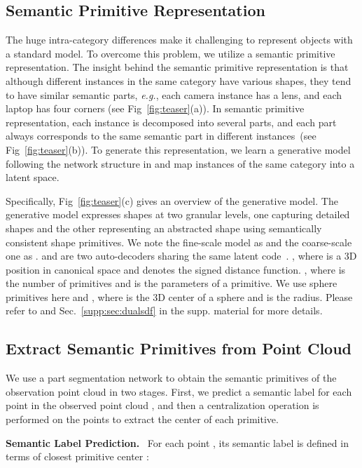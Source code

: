 \documentclass{article}
\begin{document}
\subsection{Semantic Primitive Representation}
\label{sec:objectrep}



The huge intra-category differences make it challenging to represent objects with a standard model.
To overcome this problem, we utilize a semantic primitive representation.
The insight behind the semantic primitive representation is that although different instances in the same category have various shapes, they tend to have similar semantic parts, \emph{e.g.}, each camera instance has a lens, and each laptop has four corners (see Fig~\ref{fig:teaser}(a)). 
In semantic primitive representation, each instance is decomposed into several parts, and each part always corresponds to the same semantic part in different instances~(see Fig~\ref{fig:teaser}(b)). 
To generate this representation, we learn a generative model  following the network structure in \cite{DualSDF} and map instances of the same category into a latent space. 


Specifically, Fig~\ref{fig:teaser}(c) gives an overview of the generative model. 
The generative model  expresses shapes at two granular levels, one capturing detailed shapes and the other representing an abstracted shape using semantically consistent shape primitives.
We note the fine-scale model as  and the coarse-scale one as .  and  are two auto-decoders sharing the same latent code~. , where  is a 3D position in canonical space and  denotes the signed distance function. , where  is the number of primitives and  is the parameters of a primitive. We use sphere primitives here and , where  is the 3D center of a sphere and  is the radius. Please refer to \cite{DualSDF} and Sec.~\ref{supp:sec:dualsdf} in the supp. material for more details.


\subsection{Extract Semantic Primitives from Point Cloud}
\label{sec:segmentation}
We use a part segmentation network to obtain the semantic primitives of the observation point cloud in two stages. 
First, we predict a semantic label  for each point  in the observed point cloud , and then a centralization operation is performed on the points to extract the center of each primitive.

\textbf{Semantic Label Prediction.}~
For each point , its semantic label  is defined in terms of closest primitive center :
\end{document}

